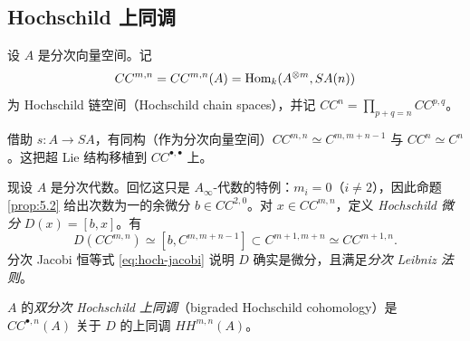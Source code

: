 
\subsection{Hochschild 上同调}\label{subsec:hoch-cohomology}

\begin{definition*}
设 $A$ 是分次向量空间。记
\[
CC^{m,n}=CC^{m,n}(A)=\operatorname{Hom}_k(A^{\otimes m},SA(n))
\]
为 Hochschild 链空间（Hochschild chain spaces），并记 $CC^n=\prod_{p+q=n}CC^{p,q}$。
\end{definition*}

借助 $s:A\to SA$，有同构（作为分次向量空间）$CC^{m,n}\simeq C^{m,m+n-1}$ 与 $CC^n\simeq C^n$。这把超 Lie 结构移植到 $CC^{\bullet,\bullet}$ 上。


现设 $A$ 是分次代数。回忆这只是 $A_\infty$-代数的特例：$m_i=0$（$i\neq2$），因此命题 \ref{prop:5.2} 给出次数为一的余微分 $b\in CC^{2,0}$。对 $x\in CC^{m,n}$，定义 \emph{Hochschild 微分} $D(x)=[b,x]$。有
\[
D(CC^{m,n})\simeq[b,C^{m,m+n-1}]\subset C^{m+1,m+n}\simeq CC^{m+1,n}.
\]
分次 Jacobi 恒等式 \eqref{eq:hoch-jacobi} 说明 $D$ 确实是微分，且满足\emph{分次 Leibniz 法则}。



\begin{definition*}
$A$ 的\emph{双分次 Hochschild 上同调}（bigraded Hochschild cohomology）是 $CC^{\bullet,n}(A)$ 关于 $D$ 的上同调 $HH^{m,n}(A)$。
\end{definition*}

